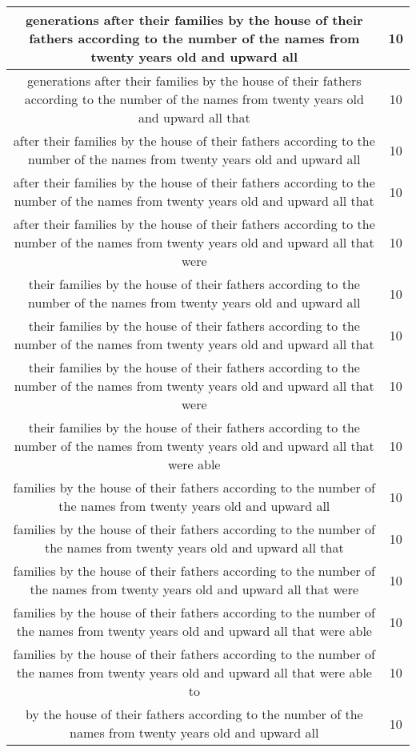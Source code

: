 \begin{center}
\begin{longtable}{|c|c|}
generations after their families by the house of their fathers according to the number of the names from twenty years old and upward all & 10\\ \hline 
generations after their families by the house of their fathers according to the number of the names from twenty years old and upward all that & 10\\ \hline 
after their families by the house of their fathers according to the number of the names from twenty years old and upward all & 10\\ \hline 
after their families by the house of their fathers according to the number of the names from twenty years old and upward all that & 10\\ \hline 
after their families by the house of their fathers according to the number of the names from twenty years old and upward all that were & 10\\ \hline 
their families by the house of their fathers according to the number of the names from twenty years old and upward all & 10\\ \hline 
their families by the house of their fathers according to the number of the names from twenty years old and upward all that & 10\\ \hline 
their families by the house of their fathers according to the number of the names from twenty years old and upward all that were & 10\\ \hline 
their families by the house of their fathers according to the number of the names from twenty years old and upward all that were able & 10\\ \hline 
families by the house of their fathers according to the number of the names from twenty years old and upward all & 10\\ \hline 
families by the house of their fathers according to the number of the names from twenty years old and upward all that & 10\\ \hline 
families by the house of their fathers according to the number of the names from twenty years old and upward all that were & 10\\ \hline 
families by the house of their fathers according to the number of the names from twenty years old and upward all that were able & 10\\ \hline 
families by the house of their fathers according to the number of the names from twenty years old and upward all that were able to & 10\\ \hline 
by the house of their fathers according to the number of the names from twenty years old and upward all & 10\\ \hline 

\end{longtable}
\end{center}
